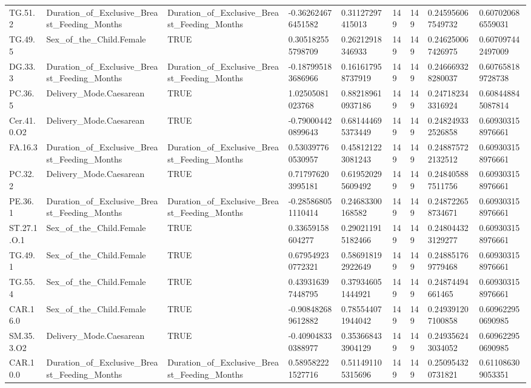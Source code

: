 \begin{longtable}{lllllllll}
TG.51.2 & Duration\_of\_Exclusive\_Breast\_Feeding\_Months & Duration\_of\_Exclusive\_Breast\_Feeding\_Months & -0.362624676451582 & 0.31127297415013 & 149 & 149 & 0.245956067549732 & 0.607020686559031 \\
TG.49.5 & Sex\_of\_the\_Child.Female & TRUE & 0.305182555798709 & 0.26212918346933 & 149 & 149 & 0.246250067426975 & 0.607097442497009 \\
DG.33.3 & Duration\_of\_Exclusive\_Breast\_Feeding\_Months & Duration\_of\_Exclusive\_Breast\_Feeding\_Months & -0.187995183686966 & 0.161617958737919 & 149 & 149 & 0.246669328280037 & 0.607658189728738 \\
PC.36.5 & Delivery\_Mode.Caesarean & TRUE & 1.02505081023768 & 0.882189610937186 & 149 & 149 & 0.247182343316924 & 0.608448845087814 \\
Cer.41.0.O2 & Delivery\_Mode.Caesarean & TRUE & -0.790004420899643 & 0.681444695373449 & 149 & 149 & 0.248249332526858 & 0.609303158976661 \\
FA.16.3 & Duration\_of\_Exclusive\_Breast\_Feeding\_Months & Duration\_of\_Exclusive\_Breast\_Feeding\_Months & 0.530397760530957 & 0.458121223081243 & 149 & 149 & 0.248875722132512 & 0.609303158976661 \\
PC.32.2 & Delivery\_Mode.Caesarean & TRUE & 0.717976203995181 & 0.619520295609492 & 149 & 149 & 0.248405887511756 & 0.609303158976661 \\
PE.36.1 & Duration\_of\_Exclusive\_Breast\_Feeding\_Months & Duration\_of\_Exclusive\_Breast\_Feeding\_Months & -0.285868051110414 & 0.24683300168582 & 149 & 149 & 0.248722658734671 & 0.609303158976661 \\
ST.27.1.O.1 & Sex\_of\_the\_Child.Female & TRUE & 0.33659158604277 & 0.290211915182466 & 149 & 149 & 0.248044323129277 & 0.609303158976661 \\
TG.49.1 & Sex\_of\_the\_Child.Female & TRUE & 0.679549230772321 & 0.586918192922649 & 149 & 149 & 0.248851769779468 & 0.609303158976661 \\
TG.55.4 & Sex\_of\_the\_Child.Female & TRUE & 0.439316397448795 & 0.379346051444921 & 149 & 149 & 0.24874494661465 & 0.609303158976661 \\
CAR.16.0 & Sex\_of\_the\_Child.Female & TRUE & -0.908482689612882 & 0.785544071944042 & 149 & 149 & 0.249391207100858 & 0.609622950690985 \\
SM.35.3.O2 & Delivery\_Mode.Caesarean & TRUE & -0.409048330388977 & 0.353668433904129 & 149 & 149 & 0.249356243034052 & 0.609622950690985 \\
CAR.10.0 & Duration\_of\_Exclusive\_Breast\_Feeding\_Months & Duration\_of\_Exclusive\_Breast\_Feeding\_Months & 0.589582221527716 & 0.511491105315696 & 149 & 149 & 0.250954320731821 & 0.611086309053351 \\

\end{longtable}
